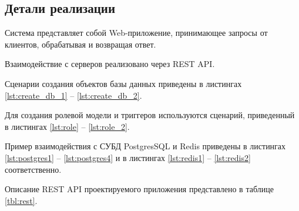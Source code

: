 \subsection{Детали реализации}
Система представляет собой Web-приложение, принимающее запросы от клиентов, обрабатывая и возвращая ответ.

Взаимодействие с серверов реализовано через REST API.  

Сценарии создания объектов базы данных приведены в листингах \ref{lst:create_db_1} -- \ref{lst:create_db_2}.

Для создания ролевой модели и триггеров используются сценарий, приведенный в листингах  \ref{lst:role} -- \ref{lst:role_2}.

Пример взаимодействия с СУБД PostgresSQL и Redis приведены в листингах  \ref{lst:postgres1} -- \ref{lst:postgres4} и в листингах \ref{lst:redis1} -- \ref{lst:redis2} соответственно.

Описание REST API проектируемого приложения представлено в таблице \ref{tbl:rest}.


